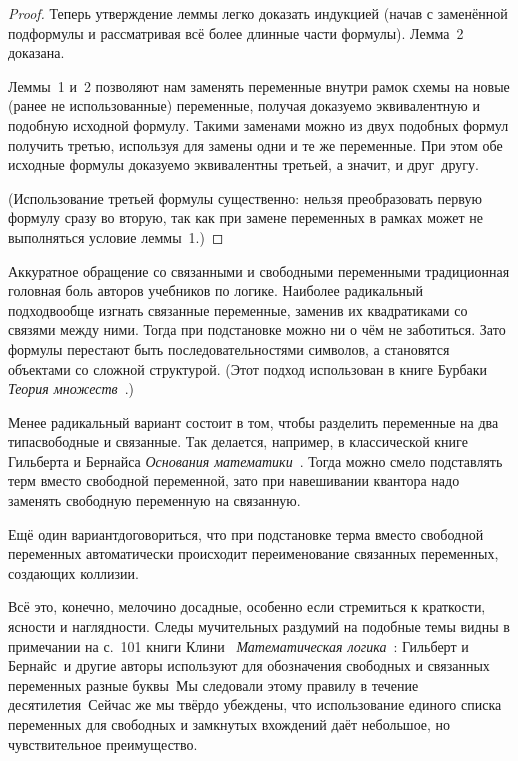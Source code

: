 \begin{proof}
Теперь утверждение леммы легко доказать индукцией (начав с заменённой
подформулы и рассматривая всё более длинные части формулы).
Лемма~2 доказана.

Леммы~1 и~2 позволяют нам заменять переменные внутри рамок схемы
на новые (ранее не использованные) переменные, получая доказуемо
эквивалентную и подобную исходной формулу. Такими заменами можно
из двух подобных формул получить третью, используя для замены
одни и те же переменные. При этом обе исходные формулы доказуемо
эквивалентны третьей, а значит, и друг~другу.

(Использование третьей формулы существенно: нельзя
преобразовать первую формулу сразу во вторую, так как при замене
переменных в рамках может не выполняться условие леммы~1.)
\end{proof}

Аккуратное обращение со связанными и свободными переменными\т
традиционная головная боль авторов учебников по логике.
Наиболее радикальный подход\т вообще изгнать связанные
переменные, заменив их квадратиками со связями между ними. Тогда
при подстановке можно ни о чём не заботиться. Зато формулы
перестают быть последовательностями символов, а становятся
объектами со сложной структурой. (Этот подход использован в
книге Бурбаки%
\emph{Теория множеств}~\cite{bourbaki}.)

Менее радикальный вариант состоит в том, чтобы разделить
переменные на два типа\т свободные и связанные. Так делается,
например, в классической книге Гильберта%
и Бернайса%
\emph{Основания математики}~\cite{hilbert-bernays}. Тогда можно
смело подставлять терм вместо свободной переменной, зато при
навешивании квантора надо заменять свободную переменную на
связанную.

Ещё один вариант\т договориться, что при подстановке терма
вместо свободной переменных автоматически происходит
переименование связанных переменных, создающих коллизии.

Всё это, конечно, мелочи\т но досадные, особенно если стремиться
к краткости, ясности и наглядности. Следы мучительных раздумий
на подобные темы видны в примечании на с.~101 книги
Клини%
%
~\emph{Математическая
логика}~\cite{kleene-logic}: 
Гильберт и Бернайс~\hole и другие авторы
используют для обозначения свободных и связанных переменных
разные буквы~\hole Мы следовали этому правилу в
течение десятилетия~\hole Сейчас же мы твёрдо
убеждены, что использование единого списка переменных для
свободных и замкнутых вхождений даёт небольшое, но
чувствительное преимущество.

